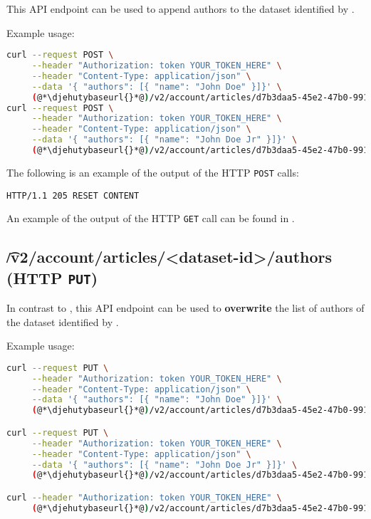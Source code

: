   This API endpoint can be used to append authors to the dataset identified
  by .

  Example usage:
\begin{lstlisting}[language=bash]
curl --request POST \
     --header "Authorization: token YOUR_TOKEN_HERE" \
     --header "Content-Type: application/json" \
     --data '{ "authors": [{ "name": "John Doe" }]}' \
     (@*\djehutybaseurl{}*@)/v2/account/articles/d7b3daa5-45e2-47b0-9910-0f7fa6a995b1/authors
curl --request POST \
     --header "Authorization: token YOUR_TOKEN_HERE" \
     --header "Content-Type: application/json" \
     --data '{ "authors": [{ "name": "John Doe Jr" }]}' \
     (@*\djehutybaseurl{}*@)/v2/account/articles/d7b3daa5-45e2-47b0-9910-0f7fa6a995b1/authors
\end{lstlisting}

  The following is an example of the output of the HTTP \texttt{POST} calls:
\begin{lstlisting}
HTTP/1.1 205 RESET CONTENT
\end{lstlisting}

  An example of the output of the HTTP \texttt{GET} call can be found in
  .

\subsection{\t{/v2/account/articles/<dataset-id>/authors} (HTTP \texttt{PUT})}

  In contrast to , this API endpoint
  can be used to \textbf{overwrite} the list of authors of the dataset identified
  by .

  Example usage:
\begin{lstlisting}[language=bash]
curl --request PUT \
     --header "Authorization: token YOUR_TOKEN_HERE" \
     --header "Content-Type: application/json" \
     --data '{ "authors": [{ "name": "John Doe" }]}' \
     (@*\djehutybaseurl{}*@)/v2/account/articles/d7b3daa5-45e2-47b0-9910-0f7fa6a995b1/authors

curl --request PUT \
     --header "Authorization: token YOUR_TOKEN_HERE" \
     --header "Content-Type: application/json" \
     --data '{ "authors": [{ "name": "John Doe Jr" }]}' \
     (@*\djehutybaseurl{}*@)/v2/account/articles/d7b3daa5-45e2-47b0-9910-0f7fa6a995b1/authors

curl --header "Authorization: token YOUR_TOKEN_HERE" \
     (@*\djehutybaseurl{}*@)/v2/account/articles/d7b3daa5-45e2-47b0-9910-0f7fa6a995b1 | jq
\end{lstlisting}

